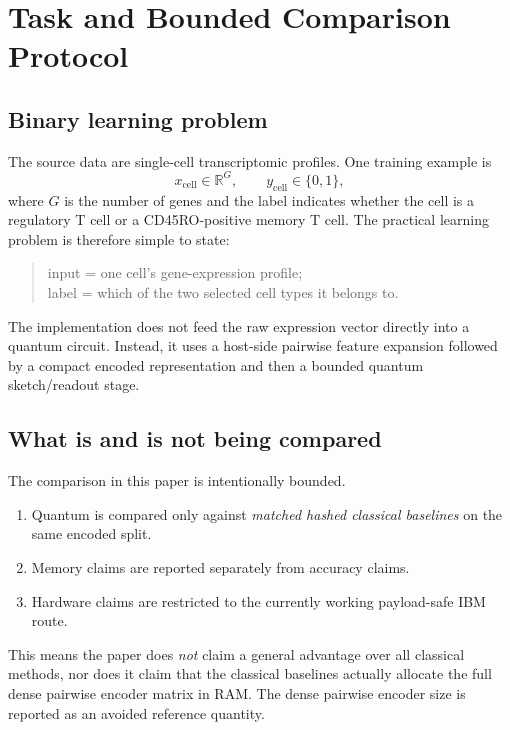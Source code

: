 \documentclass[11pt]{article}
\begin{document}
\section{Task and Bounded Comparison Protocol}

\subsection{Binary learning problem}

The source data are single-cell transcriptomic profiles. One training example is
\begin{equation}
x_{\mathrm{cell}} \in \mathbb{R}^{G}, \qquad y_{\mathrm{cell}} \in \{0,1\},
\end{equation}
where $G$ is the number of genes and the label indicates whether the cell is a regulatory T cell or a CD45RO-positive memory T cell. The practical learning problem is therefore simple to state:
\begin{quote}
input = one cell's gene-expression profile; \\
label = which of the two selected cell types it belongs to.
\end{quote}

The implementation does not feed the raw expression vector directly into a quantum circuit. Instead, it uses a host-side pairwise feature expansion followed by a compact encoded representation and then a bounded quantum sketch/readout stage.

\subsection{What is and is not being compared}

The comparison in this paper is intentionally bounded.

\begin{enumerate}
\item Quantum is compared only against \emph{matched hashed classical baselines} on the same encoded split.
\item Memory claims are reported separately from accuracy claims.
\item Hardware claims are restricted to the currently working payload-safe IBM route.
\end{enumerate}

This means the paper does \emph{not} claim a general advantage over all classical methods, nor does it claim that the classical baselines actually allocate the full dense pairwise encoder matrix in RAM. The dense pairwise encoder size is reported as an avoided reference quantity.
\end{document}

